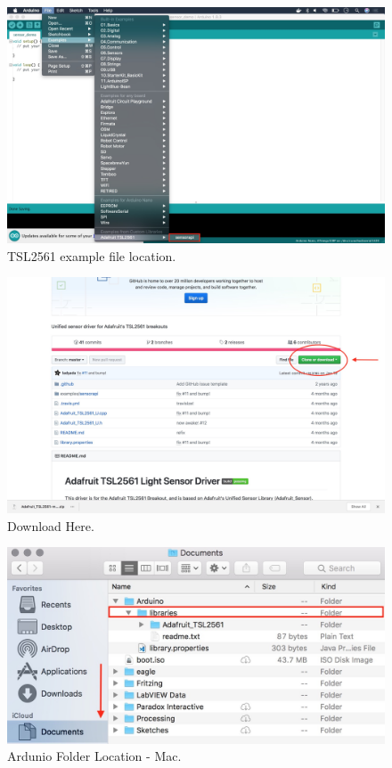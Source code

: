 \documentclass[a4paper]{article}
\begin{document}
\begin{figure}
\centering
\includegraphics[width=1\textwidth]{file_location.jpg}
\caption{\label{fig:file_location}TSL2561 example file location.}
\end{figure}

\begin{figure}
\centering
\includegraphics[width=1\textwidth]{Download_TSL2561.jpg}
\caption{\label{fig:download_help}Download Here.}
\end{figure}

\begin{figure}
\centering
\includegraphics[width=1\textwidth]{Documents_location.jpg}
\caption{\label{fig:docs_location}Ardunio Folder Location - Mac.}
\end{figure}
\end{document}
